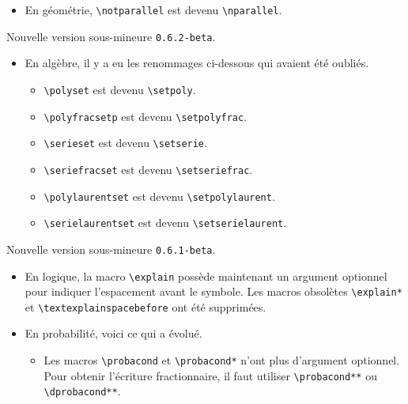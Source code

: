 \documentclass[12pt,a4paper]{article}
\theoremstyle{definition}
\begin{document}
\begin{description}[leftmargin=1em]
\begin{itemize}
        \item En géométrie, \verb+\notparallel+ est devenu \verb+\nparallel+.
    \end{itemize}



    \item[2019-10-14] Nouvelle version sous-mineure \verb+0.6.2-beta+.
    \begin{itemize}
        \item En algèbre, il y a eu les renommages ci-dessous qui avaient été oubliés.
        \begin{itemize}
        	\item \verb+\polyset+ est devenu \verb+\setpoly+.

        	\item \verb+\polyfracsetp+ est devenu \verb+\setpolyfrac+.

        	\item \verb+\serieset+ est devenu \verb+\setserie+.

        	\item \verb+\seriefracset+ est devenu \verb+\setseriefrac+.

        	\item \verb+\polylaurentset+ est devenu \verb+\setpolylaurent+.

        	\item \verb+\serielaurentset+ est devenu \verb+\setserielaurent+.
        \end{itemize}
    \end{itemize} 



    \item[2019-10-13] Nouvelle version sous-mineure \verb+0.6.1-beta+.
    \begin{itemize}
        \item En logique, la macro \verb+\explain+ possède maintenant un argument optionnel pour indiquer l'espacement avant le symbole. Les macros obsolètes \verb+\explain*+ et \verb+\textexplainspacebefore+ ont été supprimées.

        \item En probabilité, voici ce qui a évolué.
        \begin{itemize}
        	\item Les macros \verb+\probacond+ et \verb+\probacond*+ n'ont plus d'argument optionnel. Pour obtenir l'écriture fractionnaire, il faut utiliser \verb+\probacond**+ ou \verb+\dprobacond**+.


\end{itemize}
\end{itemize}
\end{description}
\end{document}

